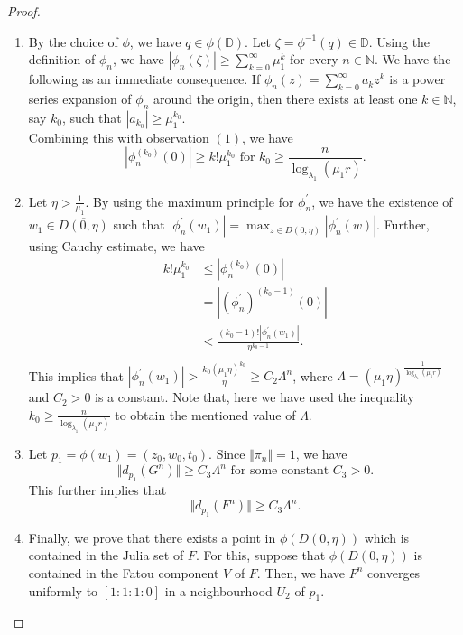 \documentclass[12pt, reqno]{amsart}
\numberwithin{equation}{section}
\theoremstyle{definition}
\theoremstyle{remark}
\theoremstyle{plain}
\theoremstyle{definition}
\numberwithin{equation}{section}
\begin{document}
\begin{proof}
\begin{enumerate}
Now, we choose $\beta=\mu_1r$. Note that, we need $\beta\in (0,1)$. For this, we modify our $\mu_1$ accordingly. Using the above claim, we have \[|\xi_n^{(k)}(0)|<k!(\mu_1 r)^k \text{ for } k<\frac{n}{\log_{\lambda_1}(\mu_1 r)}.\]
This further implies that 
\[|\phi_n^{(k)}(0)|<k!\mu_1^k \text{ for } k<\frac{n}{\log_{\lambda_1}(\mu_1 r)}.\]
\item By the choice of $\phi$, we have $q\in\phi(\mathbb{D})$. Let $\zeta=\phi^{-1}(q)\in\mathbb{D}$. Using the definition of $\phi_n$, we have $\displaystyle |\phi_n(\zeta)|\geq \sum_{k=0}^{\infty}\mu_1^k$ for every $n\in\mathbb{N}.$ 
We have the following as an immediate consequence. If $\displaystyle \phi_n(z)=\sum_{k=0}^{\infty}a_k z^k$ is a power series expansion of $\phi_n$ around the origin, then 
there exists at least one $k\in\mathbb{N}$, say $k_0$, such that $|a_{k_0}|\geq \mu_1^{k_0}$.\\
Combining this with observation $(1)$, we have 
\[|\phi_n^{(k_0)}(0)|\geq k!\mu_1^{k_0} \text{ for }k_0\geq \frac{n}{\log_{\lambda_1}(\mu_1 r)}.\]
\item Let $\eta>\frac{1}{\mu_1}$. By using the maximum principle for $\phi_n^{'}$, we have the existence of $w_1\in \overline{D(0,\eta)}$ such that $\displaystyle |\phi_n^{'}(w_1)|=\max_{z\in D(0,\eta)}|\phi_n^{'}(w)|$. Further, using Cauchy estimate, we have 
\begin{align*}
k!\mu_1^{k_0}&\leq|\phi_n^{(k_0)}(0)|\\
&=|(\phi_n^{'})^{(k_0-1)}(0)|\\
&<\frac{(k_0-1)!|\phi_n^{'}(w_1)|}{\eta^{k_0-1}}.\\
\end{align*}
This implies that $|\phi_n^{'}(w_1)|>\frac{k_0(\mu_1\eta)^{k_0}}{\eta}\geq C_2\Lambda^n$, where $\Lambda=(\mu_1\eta)^{\frac{1}{\log_{\lambda_1}(\mu_1 r)}}$ and $C_2>0$ is a constant. Note that, here we have used the inequality $k_0\geq \frac{n}{\log_{\lambda_1}(\mu_1 r)} $ to obtain the mentioned value of $\Lambda.$
\item Let $p_1=\phi(w_1)=(z_0,w_0,t_0)$. Since $\Vert\pi_n\Vert=1$, we have 
\[\Vert d_{p_1}(G^n)\Vert\geq C_3\Lambda^n \text{ for some constant }C_3>0. \]
This further implies that 
\[\Vert d_{p_1}(F^{ n})\Vert\geq C_3\Lambda^n.\]
\item Finally, we prove that there exists a point in $\phi(D(0,\eta))$ which is contained in the Julia set of $F$. For this, suppose that $\phi(D(0,\eta))$ is contained in the Fatou component $V$ of $F$. Then, we have $F^{ n}$ converges uniformly to $[1:1:1:0]$ in a neighbourhood $U_2$ of $p_1$.


\end{enumerate}
\end{proof}
\end{document}
